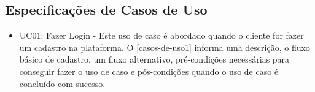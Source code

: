
\begin{apendicesenv}

\partapendices

	\chapter{Especificações de Casos de Uso}
	\label{casos-de-uso-especificacao}
	
	
	\begin{itemize}
		\item UC01: Fazer Login - Este uso de caso é abordado quando o cliente for fazer um cadastro na plataforma. O \autoref{casos-de-uso1} informa uma descrição, o fluxo básico de cadastro, um fluxo alternativo, pré-condições necessárias para conseguir fazer o uso de caso e pós-condições quando o uso de caso é concluído com sucesso.\\			
	\end{itemize}


\end{apendicesenv}
